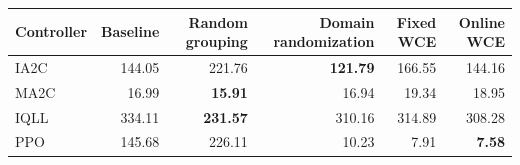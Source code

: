 \begin{tabular}{lrrrrr}
\hline
Controller & Baseline & Random grouping & Domain randomization & Fixed WCE & Online WCE \\
\hline
IA2C & 144.05 & 221.76 & \textbf{121.79} & 166.55 & 144.16 \\
MA2C & 16.99 & \textbf{15.91} & 16.94 & 19.34 & 18.95 \\
IQLL & 334.11 & \textbf{231.57} & 310.16 & 314.89 & 308.28 \\
PPO & 145.68 & 226.11 & 10.23 & 7.91 & \textbf{7.58} \\
\hline
\end{tabular}

